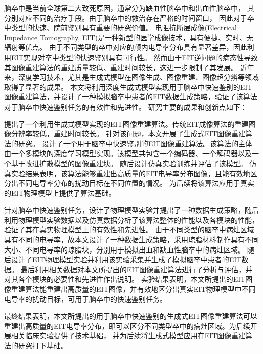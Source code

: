 
\begin{chineseabstract}

    脑卒中是当前全球第二大致死原因，通常分为缺血性脑卒中和出血性脑卒中，
    其分别对应不同的治疗手段。由于脑卒中的救治存在严格的时间窗口，
    因此对于卒中类型的快速、院前鉴别具有重要的研究价值。
    电阻抗断层成像(Electrical Impedance Tomography, EIT)是一种新型的医学成像技术，具有便捷、实时、无辐射等优点。
    由于不同类型的卒中对应的颅内电导率分布具有显著差异，因此利用EIT实现对卒中类型的快速鉴别具有可行性。
    然而由于EIT逆问题的病态性导致其图像重建算法的重建质量较低、重建时间较长，这进一步限制了其发展。
    近年来，深度学习技术，尤其是生成式模型在图像生成、图像重建、图像超分辨等领域取得了显著的成果。
    本文将利用深度生成式模型实现用于脑卒中快速鉴别的EIT图像重建算法，并设计了一种模拟脑卒中患者的EIT数据生成策略，验证了该算法对于脑卒中快速鉴别任务的有效性和先进性。
    研究主要的成果和创新点如下：

    提出了一个利用生成式模型实现的EIT图像重建算法。传统EIT成像算法的重建图像分辨率较低，重建时间较长。
    针对该问题，本文开展了生成式EIT图像重建算法的研究。
    设计了一个用于脑卒中快速鉴别的EIT图像重建算法。该算法的主体由一个多模块的深度学习模型实现。该模型共包含一个编码器、一个解码器以及一个基于改进扩散模型的图像重建块。
    随后设计仿真实验训练并评估了该模型。
    仿真实验结果表明，该算法能够重建出高质量的EIT电导率分布图像，且能有效地区分出不同电导率分布的扰动目标在不同位置的情况。
    为后续将该算法应用于真实的EIT物理模型上提供了算法基础。
    

    针对脑卒中快速鉴别任务，设计了物理模型实验并提出了一种数据生成策略，随后利用物理模型实验数据以及仿真数据分析了该算法整体的性能以及各模块的性能，验证了其在真实物理模型上的有效性和先进性。
    由于不同类型的脑卒中病灶区域具有不同的电导率，故本文设计了一种数据生成策略，采用琼脂材料制作具有不同大小、不同电导率的琼脂块，分别用于模拟出血和缺血性脑卒中的病灶区域。
    随后设计了EIT物理模型实验并利用该实验采集并生成了模拟脑卒中患者的EIT数据。
    最后利用相关数据对本文所提出的EIT图像重建算法进行了分析与评估，并对其各个模块的必要性和先进性作出说明。
    实验结果表明，本文所提出的EIT图像重建算法能重建出高质量的EIT图像，并有效地区分出真实EIT物理模型中不同电导率的扰动目标，可用于脑卒中的快速鉴别任务。
    
    最终结果表明，本文所提出的用于脑卒中快速鉴别的生成式EIT图像重建算法可以重建出高质量的EIT电导率分布，即可以区分不同类型卒中的病灶区域。为后续开展相关临床实验提供了技术基础，
    并为后续将生成式模型应用在EIT图像重建算法的研究打下基础。






\end{chineseabstract}

